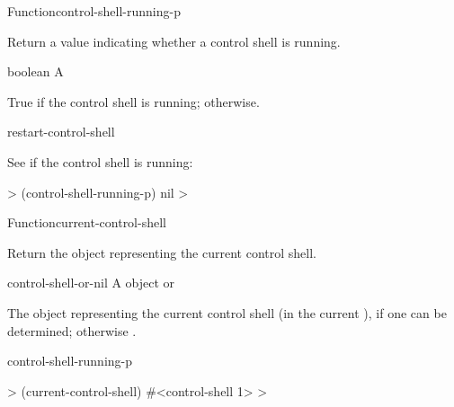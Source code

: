 \documentclass[10pt,twoside,english,pdftex]{article}
\begin{document}
\begin{functiondoc}{Function}{control-shell-running-p}{\noargs{}
    \returns{} }

\fnsyntax

\fnpurpose Return a value indicating whether a control shell is running.

\fnpackage {}

\fnmodule {}

\fnargs
\begin{args}{boolean}
\arg[boolean] A 
\end{args}

\fnreturns True if the control shell is running; \nil{} otherwise.

\begin{alsos}{restart-control-shell}
\end{alsos}

\fnexample
See if the control shell is running:
%
\W\supp
\begin{example}
  > (control-shell-running-p)
  nil
  >
\end{example}

\end{functiondoc}


\begin{functiondoc}{Function}{current-control-shell}{\noargs{} 
    \returns{} }
%

\fnsyntax

\fnpurpose Return the object representing the current control shell.

\fnpackage {}

\fnmodule {}

\fnargs
\begin{args}{control-shell-or-nil}
 A  object or \nil{}
\end{args}

\fnreturns The object representing the current control shell (in the current
), if one can be determined; otherwise \nil.

\begin{alsos}{control-shell-running-p}
\end{alsos}

\fnexample
%
\W\supp
\begin{example}
  > (current-control-shell)
  #<control-shell 1>
  >
\end{example}

\end{functiondoc}
\end{document}
